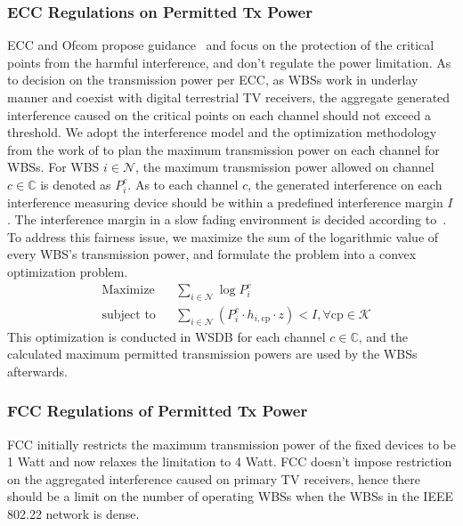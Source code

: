 \documentclass[times]{ettauth}
\theoremstyle{mytheoremstyle}
\theoremstyle{mytheoremstyle}
\theoremstyle{mytheoremstyle}
\begin{document}
\subsubsection{ECC Regulations on Permitted Tx Power}
ECC and Ofcom propose guidance~\cite{ECC186, ECMA392} and focus on the protection of the critical points from the harmful interference, and don't regulate the power limitation. 
As to decision on the transmission power per ECC, as WBSs work in underlay manner and coexist with digital terrestrial TV receivers, the aggregate generated interference caused on the critical points on each channel should not exceed a threshold.
We adopt the interference model and the optimization methodology from the work of \cite{multipleIntf_pimrc11} to plan the maximum transmission power on each channel for WBSs.
%
For WBS $i\in \mathcal{N}$, the maximum transmission power allowed on channel $c\in \mathbb{C}$ is denoted as $P_i^c$. 
As to each channel $c$, the generated interference on each interference measuring device should be within a predefined interference margin $I$.
The interference margin in a slow fading environment is decided according to~\cite{aggregate_interference_shadow_fading_2010}.
To address this fairness issue, we maximize the sum of the logarithmic value of every WBS's transmission power, and formulate the problem into a convex optimization problem.
	\begin{equation}
		\label{cvx}
		\begin{aligned}
		& {\text{Maximize}}
		& & \sum_{i\in \mathcal{N}} \log P^c_i \\
		& \text{subject to}
		& & \sum_{i\in \mathcal{N}} (P^c_i \cdot h_{i,\text{cp}}\cdot z) < I, \forall\text{cp} \in \mathcal{K}
		\end{aligned}
	\end{equation}
This optimization is conducted in WSDB for each channel $c\in \mathbb{C}$, and the calculated maximum permitted transmission powers are used by the WBSs afterwards.

\subsubsection{FCC Regulations of Permitted Tx Power}
FCC initially restricts the maximum transmission power of the fixed devices to be 1 Watt and now relaxes the limitation to 4 Watt.
FCC doesn't impose restriction on the aggregated interference caused on primary TV receivers, hence there should be a limit on the number of operating WBSs when the WBSs in the IEEE 802.22 network is dense.
\end{document}
